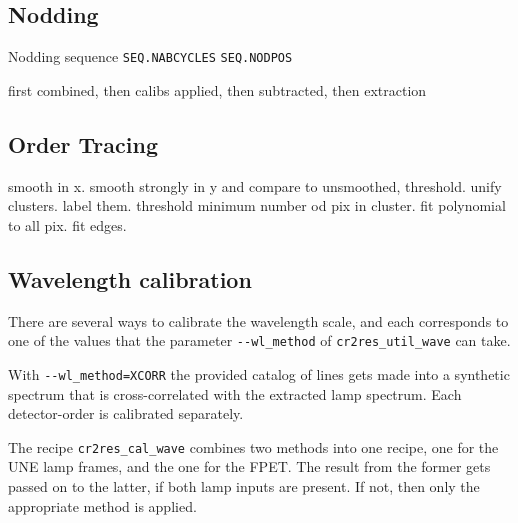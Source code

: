 \subsection{Nodding}
\label{sec:nodd}

Nodding sequence \texttt{SEQ.NABCYCLES}
\texttt{SEQ.NODPOS}

first combined, then calibs applied, then subtracted, then extraction

\subsection{Order Tracing}
\label{sec:ordertrace}

smooth in x.
smooth strongly in y and compare to unsmoothed, threshold.
unify clusters.
label them.
threshold minimum number od pix in cluster.
fit polynomial to all pix.
fit edges.

\subsection{Wavelength calibration}

There are several ways to calibrate the wavelength scale, and each corresponds to one of the values that the parameter \texttt{-{}-wl\_method} of \texttt{cr2res\_util\_wave} can take.

With \texttt{-{}-wl\_method=XCORR} the provided catalog of lines gets made into a synthetic spectrum that is cross-correlated with the extracted lamp spectrum. Each detector-order is calibrated separately.

The recipe \texttt{cr2res\_cal\_wave} combines two methods into one recipe,
one for the UNE lamp frames, and the one for the FPET. The result from the former gets passed on to the latter, if both lamp inputs are present. If not, then only the appropriate method is applied.